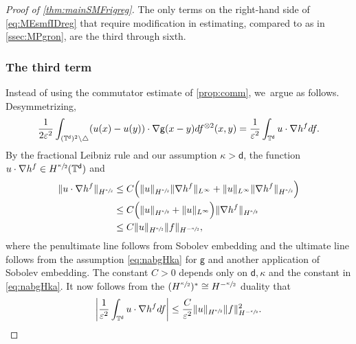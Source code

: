 \documentclass[10pt]{amsart}
\theoremstyle{plain}
\theoremstyle{definition}
\DeclarePairedDelimiter{\pa}{\lparen}{\rparen}
\newcommand{\T}{{\mathbb{T}}}
\let\vep\varepsilon
\let\ka\kappa
\let\nab\nabla
\renewcommand{\d}{\mathsf{d}}
\newcommand{\g}{{\mathsf{g}}}
\begin{document}
\begin{proof}[Proof of \cref{thm:mainSMFrigreg}]

The only terms on the right-hand side of \eqref{eq:MEsmfIDreg} that require modification in estimating, compared to as in \cref{ssec:MPgron}, are the third through sixth.

\subsubsection*{The third term}
Instead of using the commutator estimate of \cref{prop:comm}, we~argue as follows. Desymmetrizing,
\begin{align*}
\frac{1}{2\vep^2}\int_{(\T^\d)^2\setminus\triangle} \pa*{u(x)-u(y)}\cdot\nabla\g(x-y)df^{\otimes 2}(x,y)
=\frac{1}{\vep^2}\int_{\T^\d}u\cdot \nab h^{f}d f.
\end{align*}
By the fractional Leibniz rule and our assumption {$\ka>\d$}, the function $u\cdot\nab h^f \in H^{\sfrac{\ka}{2}}(\T^\d)$ and
\begin{align*}
\|u\cdot\nab h^f\|_{H^{\sfrac{\ka}{2}}} &\le C\Big(\|u\|_{H^{\sfrac{\ka}{2}}} \|\nab h^f\|_{L^\infty} + \|u\|_{L^\infty} \|\nab h^f\|_{H^{\sfrac{\ka}{2}}}\Big)\\
&\le C\Big(\|u\|_{H^{\sfrac{\ka}{2}}} + \|u\|_{L^\infty}\Big) \|\nab h^f\|_{H^{\sfrac{\ka}{2}}}\\
&\le C\|u\|_{H^{\sfrac{\ka}{2}}} \|f\|_{H^ {-\sfrac{\ka}{2}}},
\end{align*}
where the penultimate line follows from Sobolev embedding and the ultimate line follows from the assumption \eqref{eq:nabgHka} for $\g$ and another application of Sobolev embedding. The constant $C>0$ depends only on $\d,\ka$ and the constant in \eqref{eq:nabgHka}.
It now follows from the $(H^{\sfrac{\ka}{2}})^* \cong H^ {-\sfrac{\ka}{2}}$ duality that
\begin{equation}\label{eq:Gronreg1}
\bigg|\frac{1}{\vep^2}\int_{\T^\d}u\cdot \nab h^{f}d f\biggr| \le \frac{C}{\vep^2}\|u\|_{H^{\sfrac\ka2}}\|f\|_{H^{-\sfrac{\ka}2}}^2.
\end{equation}


\end{proof}
\end{document}
